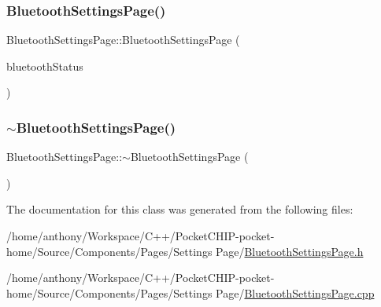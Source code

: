 \subsubsection{\texorpdfstring{Bluetooth\+Settings\+Page()}{BluetoothSettingsPage()}}
{\footnotesize\ttfamily Bluetooth\+Settings\+Page\+::\+Bluetooth\+Settings\+Page (\begin{DoxyParamCaption}\item[{\mbox{\hyperlink{classBluetoothStatus}{Bluetooth\+Status}} \&}]{bluetooth\+Status }\end{DoxyParamCaption})}

\mbox{\label{classBluetoothSettingsPage_a00a82900ebed8b3064b1c3c6882d339d}} 
\subsubsection{\texorpdfstring{$\sim$\+Bluetooth\+Settings\+Page()}{~BluetoothSettingsPage()}}
{\footnotesize\ttfamily Bluetooth\+Settings\+Page\+::$\sim$\+Bluetooth\+Settings\+Page (\begin{DoxyParamCaption}{ }\end{DoxyParamCaption})\hspace{0.3cm}{\ttfamily [inline]}}



The documentation for this class was generated from the following files\+:\begin{DoxyCompactItemize}
\item 
/home/anthony/\+Workspace/\+C++/\+Pocket\+C\+H\+I\+P-\/pocket-\/home/\+Source/\+Components/\+Pages/\+Settings Page/\mbox{\hyperlink{BluetoothSettingsPage_8h}{Bluetooth\+Settings\+Page.\+h}}\item 
/home/anthony/\+Workspace/\+C++/\+Pocket\+C\+H\+I\+P-\/pocket-\/home/\+Source/\+Components/\+Pages/\+Settings Page/\mbox{\hyperlink{BluetoothSettingsPage_8cpp}{Bluetooth\+Settings\+Page.\+cpp}}\end{DoxyCompactItemize}
